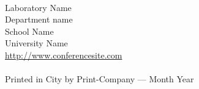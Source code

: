 \vspace *{1.7cm}
\thispagestyle{empty}
\\ Laboratory Name\\ Department name\\
School Name\\ University Name\\
\url{http://www.conferencesite.com}\\
\vspace*{0.15cm}\newline
{}\\
\vspace*{0.35cm}\newline
\noindent Printed in City by Print-Company --- Month Year
\newpage